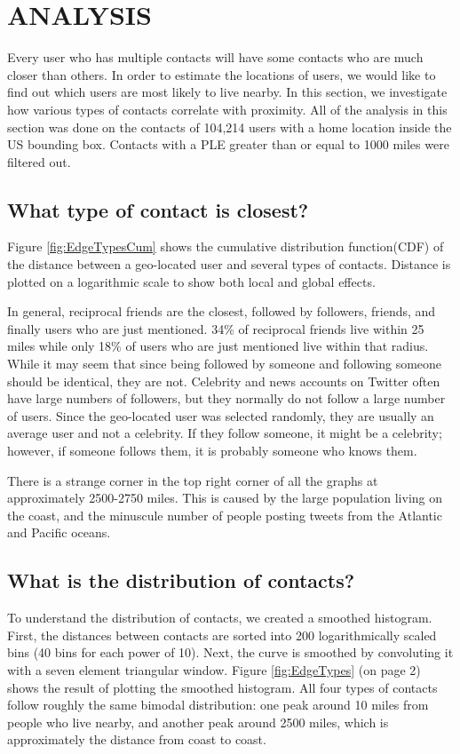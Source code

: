 
\chapter{\uppercase{Analysis}}

Every user who has multiple contacts will have some contacts who are much
closer than others. In order to estimate the locations of users, we would like
to find out which users are most likely to live nearby.  In this section, we
investigate how various types of contacts correlate with proximity.
All of the analysis in this section was done on the contacts of 104,214 users
with a home location inside the US bounding box. Contacts with a PLE greater
than or equal to 1000 miles were filtered out.

\section{What type of contact is closest?}

Figure \ref{fig:EdgeTypesCum} shows the cumulative distribution
function(CDF) of the distance between a geo-located user and several types of
contacts.
Distance is plotted on a logarithmic scale to show both local and
global effects.

In general, reciprocal friends are the closest, followed by followers, friends,
and finally users who are just mentioned.
34\% of reciprocal friends live within 25 miles while only 18\% of users who are
just mentioned live within that radius.
While it may seem that since being followed by someone and following someone
should be identical, they are not.
Celebrity and news accounts on Twitter often have large numbers of followers,
but they normally do not follow a large number of users.
Since the geo-located user was selected randomly, they are usually an average
user and not a celebrity.
If they follow someone, it might be a celebrity; however, if someone follows
them, it is probably someone who knows them.

There is a strange corner in the top right corner of all the graphs at
approximately 2500-2750 miles. This is caused by the large population living on the
coast, and the minuscule number of people posting tweets from the Atlantic and
Pacific oceans.

\section{What is the distribution of contacts?}
To understand the distribution of contacts, we created a smoothed histogram.
First, the distances between contacts are sorted into 200 logarithmically scaled bins (40 bins
for each power of 10). Next, the curve is smoothed by convoluting it with a
seven element triangular window.
Figure \ref{fig:EdgeTypes} (on page 2) shows the result of plotting the smoothed histogram.
All four types of contacts follow roughly the same bimodal distribution:
one peak around 10 miles from people who live nearby, and another peak around
2500 miles, which is approximately the distance from coast to coast.

